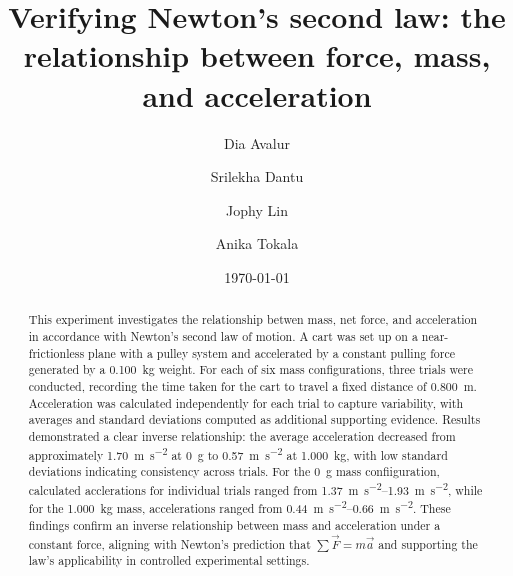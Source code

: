 ﻿\documentclass[reprint,amsmath,amssymb,prl]{revtex4-2}
\begin{document}
\title{Verifying Newton's second law: the relationship between force, mass, and acceleration}
\author{Dia Avalur}
\author{Srilekha Dantu}
\author{Jophy Lin}
\author{Anika Tokala}
\date{\today}

\begin{abstract}
This experiment investigates the relationship betwen mass, net force, and acceleration in accordance with Newton's second law of motion. A cart was set up on a near-frictionless plane with a pulley system and accelerated by a constant pulling force generated by a \qty{0.100}{\kilo\gram} weight. For each of six mass configurations, three trials were conducted, recording the time taken for the cart to travel a fixed distance of \qty{0.800}{\meter}. Acceleration was calculated independently for each trial to capture variability, with averages and standard deviations computed as additional supporting evidence. Results demonstrated a clear inverse relationship: the average acceleration decreased from approximately \qty{1.70}{\meter\per\second\squared} at \qty{0}{\gram} to \qty{0.57}{\meter\per\second\squared} at \qty{1.000}{\kilo\gram}, with low standard deviations indicating consistency across trials. For the \qty{0}{\gram} mass confiiguration, calculated acclerations for individual trials ranged from \qtyrange{1.37}{1.93}{\meter\per\second\squared}, while for the \qty{1.000}{\kilo\gram} mass, accelerations ranged from \qtyrange{0.44}{0.66}{\meter\per\second\squared}. These findings confirm an inverse relationship between mass and acceleration under a constant force, aligning with Newton's prediction that $\sum \vec{F} = m\vec{a}$ and supporting the law's applicability in controlled experimental settings.
\end{abstract}


\maketitle
\end{document}
